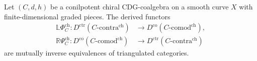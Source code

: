 \begin{theorem}
\label{thm:chiral-co-contra-correspondence}
Let $(C, d, h)$ be a conilpotent chiral CDG-coalgebra on a smooth
curve $X$ with finite-dimensional graded pieces.  The derived functors
\begin{align*}
\mathbb{L}\Phi_C^{\mathrm{ch}}\colon
D^{\mathrm{ctr}}(C\text{-}\mathrm{contra}^{\mathrm{ch}})
&\longrightarrow
D^{\mathrm{co}}(C\text{-}\mathrm{comod}^{\mathrm{ch}}), \\
\mathbb{R}\Psi_C^{\mathrm{ch}}\colon
D^{\mathrm{co}}(C\text{-}\mathrm{comod}^{\mathrm{ch}})
&\longrightarrow
D^{\mathrm{ctr}}(C\text{-}\mathrm{contra}^{\mathrm{ch}})
\end{align*}
are mutually inverse equivalences of triangulated categories.
\end{theorem}


